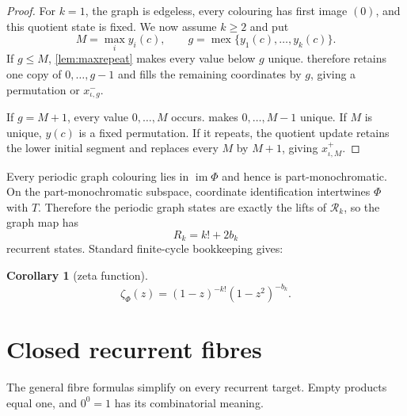 \documentclass[11pt,a4paper]{amsart}
\newtheorem{corollary}[theorem]{Corollary}
\theoremstyle{definition}
\theoremstyle{remark}
\newcommand{\mex}{\operatorname{mex}}
\newcommand{\PhiG}{\Phi}
\newcommand{\Rec}{\mathcal R}
\begin{document}
\begin{proof}
For \(k=1\), the graph is edgeless, every colouring has first image
\((0)\), and this quotient state is fixed.  We now assume \(k\ge2\) and put
\[
 M=\max_i y_i(c),\qquad
 g=\mex\{y_1(c),\ldots,y_k(c)\}.
\]
If \(g\le M\),
\cref{lem:maxrepeat} makes every value below \(g\) unique.
 therefore retains one copy of
\(0,\ldots,g-1\) and fills the remaining coordinates by \(g\), giving a
permutation or \(x^-_{\iota,g}\).

If \(g=M+1\), every value \(0,\ldots,M\) occurs.
 makes \(0,\ldots,M-1\) unique.  If \(M\) is unique,
\(y(c)\) is a fixed permutation.  If it repeats, the quotient update retains
the lower initial segment and replaces every \(M\) by \(M+1\), giving
\(x^+_{\iota,M}\).
\end{proof}

Every periodic graph colouring lies in \(\operatorname{im}\PhiG\) and hence
is part-monochromatic.  On the part-monochromatic subspace, coordinate
identification intertwines \(\PhiG\) with \(T\).  Therefore the periodic
graph states are exactly the lifts of \(\Rec_k\), so the graph map has
\[
 R_k=k!+2b_k
\]
recurrent states.  Standard finite-cycle bookkeeping
\cite{ArtinMazur1965} gives:

\begin{corollary}[zeta function]\label{cor:zeta}
\[
                   \zeta_{\PhiG}(z)
                   =(1-z)^{-k!}(1-z^2)^{-b_k}.
\]
\end{corollary}

\section{Closed recurrent fibres}

The general fibre formulas simplify on every recurrent target.  Empty
products equal one, and \(0^0=1\) has its combinatorial meaning.
\end{document}

